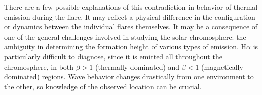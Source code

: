 \begin{framed}


    There are a few possible explanations of this
    contradiction in behavior of thermal emission during the flare.
    It may reflect a physical difference in the configuration or dynamics
    between the individual flares themselves.
    It may be a consequence of
    one of the general challenges involved in studying the solar
    chromosphere: the ambiguity in determining the formation height of various
    types of emission.
    H$\alpha$ is particularly difficult to diagnose, since it is
    emitted all throughout the chromosphere, in both
    $\beta > 1$ (thermally dominated) and
    $\beta < 1$ (magnetically dominated) regions.
    Wave behavior changes drastically from one environment to the other, so
    knowledge of the observed location can be crucial.

\end{framed}
